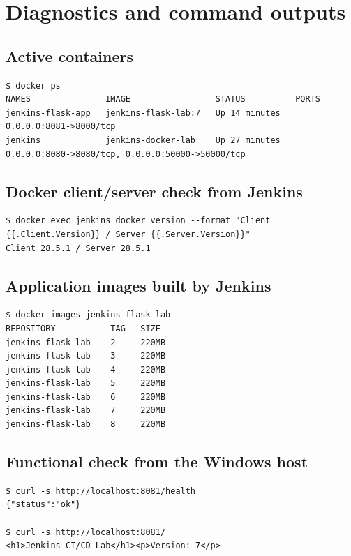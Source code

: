 \documentclass[11pt,a4paper]{article}
\begin{document}
\section{Diagnostics and command outputs}

\subsection{Active containers}

\begin{lstlisting}
$ docker ps
NAMES               IMAGE                 STATUS          PORTS
jenkins-flask-app   jenkins-flask-lab:7   Up 14 minutes   0.0.0.0:8081->8000/tcp
jenkins             jenkins-docker-lab    Up 27 minutes   0.0.0.0:8080->8080/tcp, 0.0.0.0:50000->50000/tcp
\end{lstlisting}

\subsection{Docker client/server check from Jenkins}

\begin{lstlisting}
$ docker exec jenkins docker version --format "Client {{.Client.Version}} / Server {{.Server.Version}}"
Client 28.5.1 / Server 28.5.1
\end{lstlisting}

\subsection{Application images built by Jenkins}

\begin{lstlisting}
$ docker images jenkins-flask-lab
REPOSITORY           TAG   SIZE
jenkins-flask-lab    2     220MB
jenkins-flask-lab    3     220MB
jenkins-flask-lab    4     220MB
jenkins-flask-lab    5     220MB
jenkins-flask-lab    6     220MB
jenkins-flask-lab    7     220MB
jenkins-flask-lab    8     220MB
\end{lstlisting}

\subsection{Functional check from the Windows host}

\begin{lstlisting}
$ curl -s http://localhost:8081/health
{"status":"ok"}

$ curl -s http://localhost:8081/
<h1>Jenkins CI/CD Lab</h1><p>Version: 7</p>
\end{lstlisting}
\end{document}
